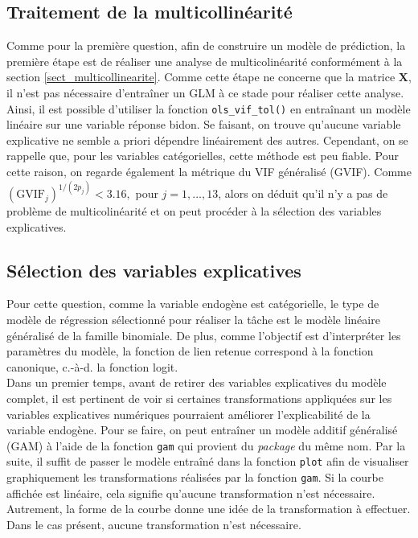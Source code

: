 \documentclass{article}
\begin{document}
	\subsection{Traitement de la multicollinéarité}	
	Comme pour la première question, afin de construire un modèle de prédiction, la première étape est de réaliser une analyse de multicolinéarité conformément à la section \ref{sect_multicollinearite}.
	Comme cette étape ne concerne que la matrice $\boldsymbol{X}$, il n'est pas nécessaire d'entraîner un GLM à ce stade pour réaliser cette analyse. Ainsi, il est possible d'utiliser la fonction \texttt{ols\_vif\_tol()} en entraînant un modèle linéaire sur une variable réponse bidon. Se faisant, on trouve qu'aucune variable explicative ne semble a priori dépendre linéairement des autres. Cependant, on se rappelle que, pour les variables catégorielles, cette méthode est peu fiable. Pour cette raison, on regarde également la métrique du VIF généralisé (GVIF). Comme
	$(\mathrm{GVIF}_j)^{1/(2 p_j)} < 3.16,$ pour $j=1,\dots,13$, alors on déduit qu'il n'y a pas de problème de multicolinéarité et on peut procéder à la sélection des variables explicatives.


	\subsection{Sélection des variables explicatives}\label{sect_qst2_selection_variables}	
	Pour cette question, comme la variable endogène est catégorielle, le type de modèle de régression sélectionné pour réaliser la tâche est le modèle linéaire généralisé de la famille binomiale. De plus, comme l'objectif est d'interpréter les paramètres du modèle, la fonction de lien retenue correspond à la fonction canonique, c.-à-d. la fonction logit.\\
	
	Dans un premier temps, avant de retirer des variables explicatives du modèle complet, il est pertinent de voir si certaines transformations appliquées sur les variables explicatives numériques pourraient améliorer l'explicabilité de la variable endogène. Pour se faire, on peut entraîner un modèle additif généralisé (GAM) à l'aide de la fonction \texttt{gam} qui provient du \textit{package} du même nom. Par la suite, il suffit de passer le modèle entraîné dans la fonction \texttt{plot} afin de visualiser graphiquement les transformations réalisées par la fonction \texttt{gam}. Si la courbe affichée est linéaire, cela signifie qu'aucune transformation n'est nécessaire. Autrement, la forme de la courbe donne une idée de la transformation à effectuer. Dans le cas présent, aucune transformation n'est nécessaire.\\
\end{document}
